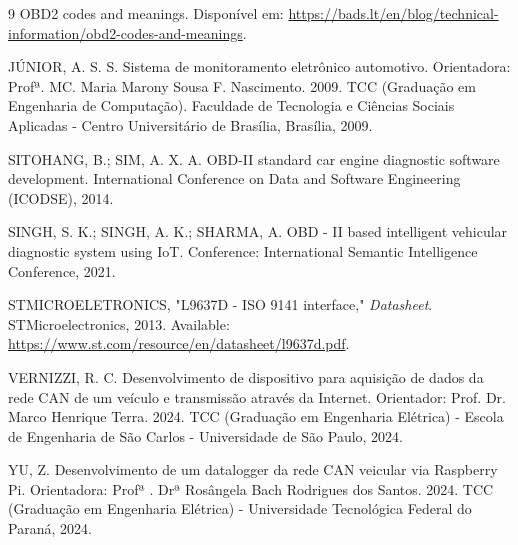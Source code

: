 \documentclass[a4paper, 12pt]{article}
\begin{document}
\begin{thebibliography}{9}
OBD2 codes and meanings. Disponível em: \url{https://bads.lt/en/blog/technical-information/obd2-codes-and-meanings}.

JÚNIOR, A. S. S. Sistema de monitoramento eletrônico automotivo. Orientadora: Profª. MC. Maria Marony Sousa F. Nascimento. 2009. TCC (Graduação em Engenharia de Computação). Faculdade de Tecnologia e Ciências Sociais Aplicadas - Centro Universitário de Brasília, Brasília, 2009.

SITOHANG, B.; SIM, A. X. A. OBD-II standard car engine diagnostic software development. International Conference on Data and Software Engineering (ICODSE), 2014.

SINGH, S. K.; SINGH, A. K.; SHARMA, A. OBD - II based intelligent vehicular diagnostic system using IoT. Conference: International Semantic Intelligence Conference, 2021.

STMICROELETRONICS, "L9637D - ISO 9141 interface," \textit{Datasheet}. STMicroelectronics, 2013. Available: \url{https://www.st.com/resource/en/datasheet/l9637d.pdf}.

VERNIZZI, R. C. Desenvolvimento de dispositivo para aquisição de dados da rede CAN de um veículo e transmissão através da Internet. Orientador: Prof. Dr. Marco Henrique Terra. 2024. TCC (Graduação em Engenharia Elétrica) - Escola de Engenharia de São Carlos - Universidade de São Paulo, 2024.

YU, Z. Desenvolvimento de um datalogger da rede CAN veicular via Raspberry Pi. Orientadora: Profª . Drª Rosângela Bach Rodrigues dos Santos. 2024. TCC (Graduação em Engenharia Elétrica) - Universidade Tecnológica Federal do Paraná, 2024.

\end{thebibliography}
 
\end{document}
